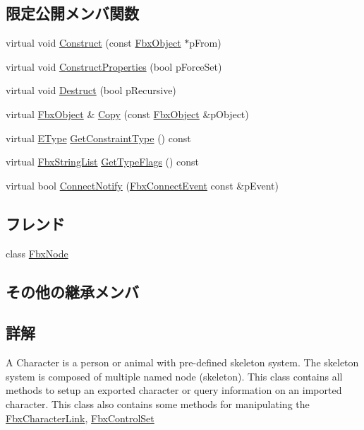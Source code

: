 \subsection*{限定公開メンバ関数}
\begin{DoxyCompactItemize}
\item 
virtual void \hyperlink{class_fbx_character_afccb9b74c28560f04f05581a55c0b58a}{Construct} (const \hyperlink{class_fbx_object}{Fbx\+Object} $\ast$p\+From)
\item 
virtual void \hyperlink{class_fbx_character_ae66db4ff3c527db3c47064c700ce179a}{Construct\+Properties} (bool p\+Force\+Set)
\item 
virtual void \hyperlink{class_fbx_character_a6a5bb02a06df228598ebfc4158c30b29}{Destruct} (bool p\+Recursive)
\item 
virtual \hyperlink{class_fbx_object}{Fbx\+Object} \& \hyperlink{class_fbx_character_a54ea68d64fe0dc2e052e2b5e475fa170}{Copy} (const \hyperlink{class_fbx_object}{Fbx\+Object} \&p\+Object)
\item 
virtual \hyperlink{class_fbx_constraint_a49c1634663395eab7c28856df233ec66}{E\+Type} \hyperlink{class_fbx_character_ab6c9f1540880fa72c17a27d19ff11425}{Get\+Constraint\+Type} () const
\item 
virtual \hyperlink{class_fbx_string_list}{Fbx\+String\+List} \hyperlink{class_fbx_character_ab0b957ac50d562eb146fff27e0f6b937}{Get\+Type\+Flags} () const
\item 
virtual bool \hyperlink{class_fbx_character_a42e5f6d72c0669b6eedf0cb511720845}{Connect\+Notify} (\hyperlink{class_fbx_connect_event}{Fbx\+Connect\+Event} const \&p\+Event)
\end{DoxyCompactItemize}
\subsection*{フレンド}
\begin{DoxyCompactItemize}
\item 
class \hyperlink{class_fbx_character_a7b27a89b3d5b45cd1a28960c77e4880b}{Fbx\+Node}
\end{DoxyCompactItemize}
\subsection*{その他の継承メンバ}


\subsection{詳解}
A Character is a person or animal with pre-\/defined skeleton system. The skeleton system is composed of multiple named node (skeleton). This class contains all methods to setup an exported character or query information on an imported character. This class also contains some methods for manipulating the \hyperlink{class_fbx_character_link}{Fbx\+Character\+Link}, \hyperlink{class_fbx_control_set}{Fbx\+Control\+Set}

